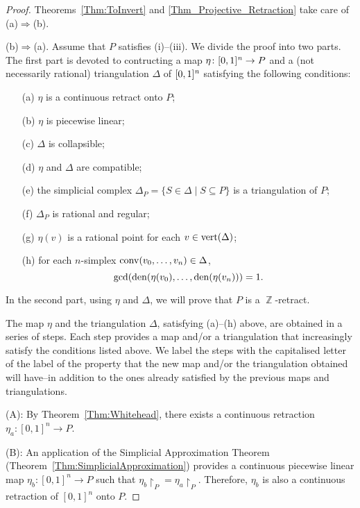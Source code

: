 \documentclass[reqno, draft]{amsart}
\theoremstyle{definition}
\begin{document}
\begin{proof}
Theorems~\ref{Thm:ToInvert} and \ref{Thm_Projective_Retraction} 
take care of  (a)$\Rightarrow$(b).
\medskip

(b)$\Rightarrow$(a). 
Assume that $P$ satisfies (i)--(iii).
We divide the proof into two parts.
The first part is devoted to contructing a map $\eta\colon{[0,1]^{\it n}}\to P$ 
and a  (not necessarily rational) triangulation $\Delta$ of ${[0,1]^{\it n}}$ 
satisfying the following conditions:
\begin{itemize}
\item[(a)] $\eta$ is a continuous retract  onto $P$;
\item[(b)] $\eta$ is piecewise linear;
\item[(c)] $\Delta$ is collapsible;
\item[(d)] $\eta$ and $\Delta$ are compatible;
\item[(e)] the simplicial complex $\Delta_P=\{S\in\Delta\mid S\subseteq P\}$ is a triangulation of $P$;
\item[(f)]  $\Delta_P$ is rational and regular;
\item[(g)] $\eta(v)$ is a rational point for each $v\in\operatorname{{\rm vert}}(\Delta)$;
\item[(h)] for each $n$-simplex $\operatorname{{\rm conv}}( v_0,\ldots,v_n )\in\Delta$,\  \[\gcd(\operatorname{{\rm den}}(\eta(v_0),\ldots,\operatorname{{\rm den}}(\eta(v_n)))=1.\] 
\end{itemize} 
In the second part, using $\eta$ and $\Delta$, 
we will prove that $P$ is a $\operatorname{\mathbb{Z}}$-retract.
\medskip

The map $\eta$ and the triangulation $\Delta$, satisfying (a)--(h) above, are obtained 
in a series of steps.
Each step provides a  map and/or a triangulation 
that increasingly satisfy the conditions listed above. 
We label the steps with the capitalised letter 
of the label of the property that the new map and/or 
the triangulation obtained will have--in addition to the ones 
already satisfied by the previous maps and triangulations. 
\medskip

 (A): 
By Theorem~\ref{Thm:Whitehead}, 
there exists a continuous retraction $\eta_a\colon[0,1]^n\to P$. 

\medskip

 (B):
An application of the Simplicial Approximation Theorem 
(Theorem~\ref{Thm:SimplicialApproximation}) 
provides a continuous piecewise linear map 
$\eta_b\colon[0,1]^n\to P$ such that 
$\eta_b{\upharpoonright}_{P}=\eta_a{\upharpoonright}_{P}$. 
Therefore, $\eta_b$ is also a continuous retraction
 of $[0,1]^n$ onto $P$.
\medskip


\end{proof}
\end{document}
